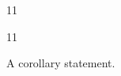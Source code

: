 \documentclass[paper=A4]{ropas-poster}
\begin{document}
\begin{postergrid}{1}{1}
\begin{posterblock}{1}{1}
\begin{corollary}A corollary statement.\end{corollary}
\end{posterblock}
\end{postergrid}
\end{document}
